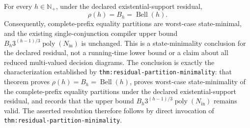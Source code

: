 For every \(h\in\mathbb N_{+}\), under the declared existential-support residual,
\[
\rho(h)=B_h=\operatorname{Bell}(h).
\]
Consequently, complete-prefix equality partitions are worst-case state-minimal, and the existing single-conjunction compiler upper bound \(B_h3^{(h-1)/3}\operatorname{poly}(N_{\mathrm{in}})\) is unchanged. This is a state-minimality conclusion for the declared residual, not a running-time lower bound or a claim about all reduced multi-valued decision diagrams.
The conclusion is exactly the characterization established by \texttt{thm:residual-partition-minimality}: that theorem proves \(\rho(h)=B_h=\operatorname{Bell}(h)\), proves worst-case state-minimality of the complete-prefix equality partitions under the declared existential-support residual, and records that the upper bound \(B_h3^{(h-1)/3}\operatorname{poly}(N_{\mathrm{in}})\) remains valid. The asserted resolution therefore follows by direct invocation of \texttt{thm:residual-partition-minimality}.
